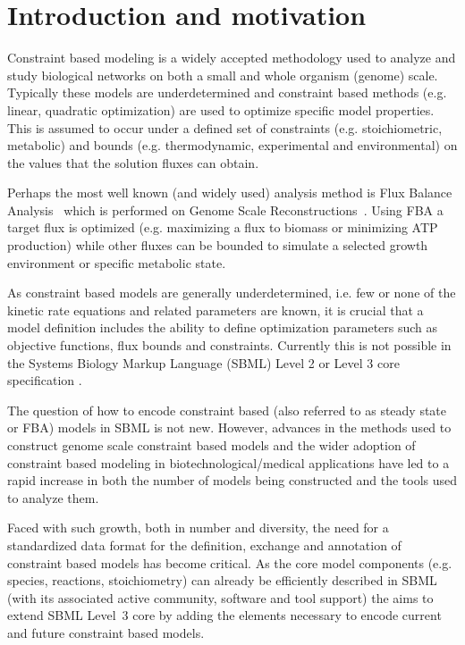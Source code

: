 
\section{ Introduction and motivation } \label{intro} 

Constraint based modeling is a widely accepted methodology used to 
analyze and study biological networks on both a small and whole organism 
(genome) scale. Typically these models are underdetermined and 
constraint based methods (e.g. linear, quadratic optimization) are used 
to optimize specific model properties. This is assumed to occur under a 
defined set of constraints (e.g. stoichiometric, metabolic) and bounds 
(e.g. thermodynamic, experimental and environmental) on the values that 
the solution fluxes can obtain. 

Perhaps the most well known (and widely used) analysis method is Flux 
Balance Analysis~\citep[FBA; ][]{orth_2010} which is performed on Genome 
Scale Reconstructions~\citep[GSR's; ][]{oberhardt_2009}. Using FBA a 
target flux is optimized (e.g. maximizing a flux to biomass or 
minimizing ATP production) while other fluxes can be bounded to simulate 
a selected growth environment or specific metabolic state. 

As constraint based models are generally underdetermined, i.e. few or 
none of the kinetic rate equations and related parameters are known, it 
is crucial that a model definition includes the ability to define 
optimization parameters such as objective functions, flux bounds and 
constraints. Currently this is not possible in the Systems Biology 
Markup Language (SBML) Level 2 or Level 3 core specification 
\citep{sbml, sbml3core}. 

The question of how to encode constraint based (also referred to as 
steady state or FBA) models in SBML is not new. However, advances in the 
methods used to construct genome scale constraint based models and the 
wider adoption of constraint based modeling in biotechnological/medical 
applications have led to a rapid increase in both the number of models 
being constructed and the tools used to analyze them. 

Faced with such growth, both in number and diversity, the need for a 
standardized data format for the definition, exchange and annotation of 
constraint based models has become critical. As the core model 
components (e.g. species, reactions, stoichiometry) can already be 
efficiently described in SBML (with its associated active community, 
software and tool support) the \FBCPackage aims to extend SBML Level~3 
core by adding the elements necessary to encode current and future 
constraint based models. 

